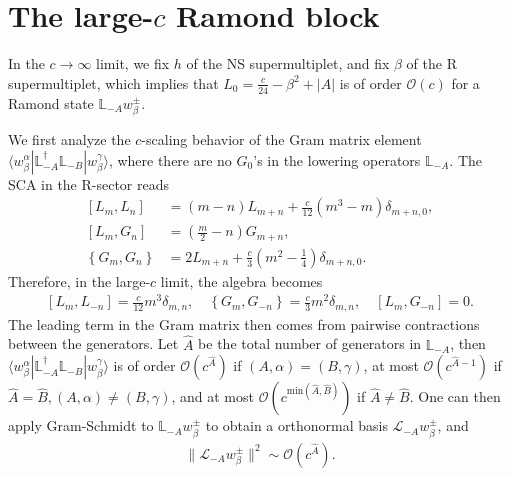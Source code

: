 \documentclass[12pt]{article}
\newcommand{\ie}{\begin{equation}\begin{aligned}}
\newcommand{\fe}{\end{aligned}\end{equation}}
\numberwithin{equation}{section}
\begin{document}
\section{The large-$c$ Ramond block}

In the $c\rightarrow \infty$ limit, we fix $h$ of the NS supermultiplet, and fix $\beta$ of the R supermultiplet, which implies that $L_0 = \frac{c}{24} - \beta^2 + |A|$ is of order $\mathcal{O}(c)$ for a Ramond state $\mathbb{L}_{-A}w^\pm_\beta$.

We first analyze the $c$-scaling behavior of the Gram matrix element $\langle w^\alpha_\beta|\mathbb{L}_{-A}^\dagger \mathbb{L}_{-B}|w^\gamma_\beta\rangle$, where there are no $G_0$'s in the lowering operators $\mathbb{L}_{-A}$. The SCA in the R-sector reads
\ie
{\left[L_m, L_n\right] } & =(m-n) L_{m+n}+\frac{c}{12}\left(m^3-m\right) \delta_{m+n, 0}, \\
{\left[L_m, G_n\right] } & =\left(\frac{m}{2}-n\right) G_{m+n}, \\
\left\{G_m, G_n\right\} & =2 L_{m+n}+\frac{c}{3}\left(m^2-\frac{1}{4}\right) \delta_{m+n, 0}.
\fe
Therefore, in the large-$c$ limit, the algebra becomes
\ie
{\left[L_m, L_{-n}\right] } =\frac{c}{12}m^3 \delta_{m, n},\quad \left\{G_m, G_{-n}\right\} = \frac{c}{3}m^2 \delta_{m, n},\quad {\left[L_m, G_{-n}\right] } = 0.
\fe
The leading term in the Gram matrix then comes from pairwise contractions between the generators. Let $\hat{A}$ be the total number of generators in $\mathbb{L}_{-A}$, then $\langle w^\alpha_\beta|\mathbb{L}_{-A}^\dagger \mathbb{L}_{-B}|w^\gamma_\beta\rangle$ is of order $\mathcal{O}(c^{\hat{A}})$ if $(A,\alpha)=(B,\gamma)$, at most $\mathcal{O}(c^{\hat{A}-1})$ if $\hat{A}=\hat{B}, (A,\alpha)\neq (B,\gamma)$, and at most $\mathcal{O}(c^{\mathrm{min}(\hat{A}, \hat{B})})$ if $\hat{A}\neq \hat{B}$. One can then apply Gram-Schmidt to $\mathbb{L}_{-A}w^{\pm}_\beta$ to obtain a orthonormal basis $\mathcal{L}_{-A}w^{\pm}_\beta$, and
\ie
\|\mathcal{L}_{-A}w^\pm_{\beta}\|^2 \sim \mathcal{O}(c^{\hat{A}}).
\fe
\end{document}
